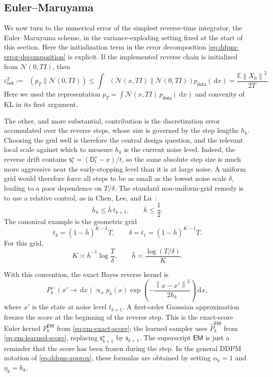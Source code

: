 \documentclass{amsart}
\numberwithin{equation}{section}
\theoremstyle{plain}
\theoremstyle{definition}
\theoremstyle{remark}
\DeclareMathOperator{\KL}{D_{\mathsf{KL}}}
\newcommand{\E}{\mathbb{E}}
\newcommand{\dd}{\,\mathrm{d}}
\newcommand{\Id}{I}
\newcommand{\wh}[1]{\widehat{#1}}
\newcommand{\norm}[1]{\left\lVert #1 \right\rVert}
\newcommand{\pdata}{p_{\mathsf{data}}}
\newcommand{\sstar}{\mathsf{s}^{\star}}
\newcommand{\score}{\mathsf{s}}
\newcommand{\dstar}{\mathsf{D}^{\star}}
\newcommand{\epsinit}{\varepsilon_{\mathsf{init}}}
\newcommand{\normal}[2]{\mathcal{N}\!\left(#1,#2\right)}
\begin{document}
\subsection{Euler--Maruyama}

We now turn to the numerical error of the simplest reverse-time integrator, the
Euler--Maruyama scheme, in the variance-exploding setting fixed at the start of
this section.  Here the initialization term in the error decomposition
\eqref{eq:ddpm-error-decomposition} is explicit.  If the implemented
reverse chain is initialized from $\normal{0}{T\Id}$, then
\begin{equation}\label{eq:ve-init-kl}
    \epsinit^2
    :=
    \KL(p_T\|\normal{0}{T\Id})
    \leq
    \int
    \KL\!\left(\normal{x}{T\Id}\middle\|\normal{0}{T\Id}\right)
    \pdata(\dd x)
    =
    \frac{\E\norm{X_0}^2}{2T}.
\end{equation}
Here we used the representation
$p_T=\int\normal{x}{T\Id}\,\pdata(\dd x)$ and convexity of KL in its first
argument.

The other, and more substantial, contribution is the discretization error
accumulated over the reverse steps, whose size is governed by the step lengths
$h_k$.  Choosing the grid well is therefore the central design question, and the
relevant local scale against which to measure $h_k$ is the current noise level.
Indeed, the reverse drift contains
$\sstar_t=(\dstar_t-x)/t$, so the same absolute step size is much more
aggressive near the early-stopping level than it is at large noise.  A uniform
grid would therefore force all steps to be as small as the lowest noise scale
$\delta$, leading to a poor dependence on $T/\delta$.  The standard
non-uniform-grid remedy is to use a relative control, as in Chen, Lee, and Lu~\cite{chen2023improvedsgm}:
\begin{equation}\label{eq:relative-mesh}
    h_k\leq \bar h\,t_{k+1},
    \qquad
    \bar h\leq \frac12.
\end{equation}
The canonical example is the geometric grid
\begin{equation}\label{eq:geometric-ve-grid}
    t_k=(1-\bar h)^{K-k}T,
    \qquad
    \delta=t_1=(1-\bar h)^{K-1}T.
\end{equation}
For this grid,
\[
    K\asymp \bar h^{-1}\log\frac{T}{\delta},
    \qquad
    \bar h\asymp \frac{\log(T/\delta)}{K}.
\]

With this convention, the exact Bayes reverse kernel is
\begin{equation}\label{eq:ve-backward-kernel}
    P_k^{\leftarrow}(x' \to \dd x)
    \propto_x
    p_k(x)
    \exp\!\left(-\frac{\norm{x-x'}^2}{2h_k}\right)\dd x,
\end{equation}
where $x'$ is the state at noise level $t_{k+1}$.  A first-order Gaussian
approximation freezes the score at the beginning of the reverse step.  This is
the exact-score Euler kernel $P_k^{\mathsf{EM}}$ from
\eqref{eq:em-exact-score}; the learned sampler uses
$\wh P_k^{\mathsf{EM}}$ from \eqref{eq:em-learned-score}, replacing
$\sstar_{k+1}$ by $\score_{k+1}$.
The superscript $\mathsf{EM}$ is just a reminder that the score has been
frozen during the step.  In the general DDPM notation of
\eqref{eq:ddpm-approx}, these formulas are obtained by setting
$\alpha_k=1$ and $\eta_k=h_k$.
\end{document}
